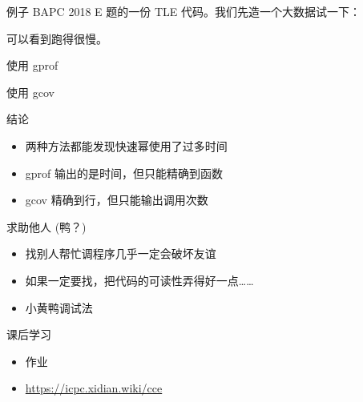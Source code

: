 \documentclass[10pt,mathserif]{beamer}
\begin{document}
\begin{frame}{例子}
	BAPC 2018 E 题的一份 TLE 代码。我们先造一个大数据试一下：
	
	可以看到跑得很慢。
\end{frame}

\begin{frame}{使用 gprof}
	
\end{frame}

\begin{frame}[allowframebreaks]{使用 gcov}
	
\end{frame}

\begin{frame}{结论}
	\begin{itemize}
		\item 两种方法都能发现快速幂使用了过多时间
		\item gprof 输出的是时间，但只能精确到函数
		\item gcov 精确到行，但只能输出调用次数
	\end{itemize}
\end{frame}

\begin{frame}{求助他人 (鸭？)}
	\begin{itemize}
		\item 找别人帮忙调程序几乎一定会破坏友谊
		\item 如果一定要找，把代码的可读性弄得好一点……
		\item 小黄鸭调试法
	\end{itemize}
\end{frame}

\begin{frame}{课后学习}
	\begin{itemize}
		\item 作业
		\item \url{https://icpc.xidian.wiki/cce}
	\end{itemize}
\end{frame}

{\xdbg%
\begin{frame}
\end{frame}}
\end{document}
